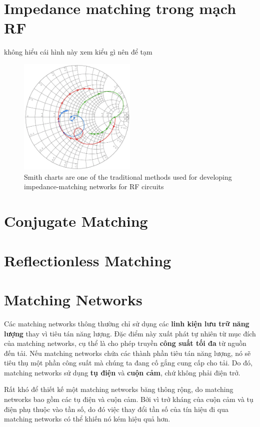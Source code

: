     \section{Impedance matching trong mạch RF}
        không hiểu cái hình này xem kiểu gì nên để tạm\cite{cadence_impedance}
        \begin{figure}[h]
            \centering
            \includegraphics[width=0.5\textwidth]{figures/smith_chart.png}
            \caption{Smith charts are one of the traditional methods used for developing impedance-matching networks for RF circuits}
            \label{fig:smith_chart}
        \end{figure}

    \section{Conjugate Matching}
    \section{Reflectionless Matching}
    \cite{cadence2021conjugatematching}
    
    \section{Matching Networks}
        Các matching networks thông thường chỉ sử dụng các \textbf{linh kiện lưu trữ năng lượng} 
        thay vì tiêu tán năng lượng. Đặc điểm này xuất phát tự nhiên từ mục đích 
        của matching networks, cụ thể là cho phép truyền \textbf{công suất tối đa} từ nguồn đến tải. 
        Nếu matching networks chứa các thành phần tiêu tán năng lượng, nó sẽ tiêu thụ một phần công suất 
        mà chúng ta đang cố gắng cung cấp cho tải. Do đó, matching networks sử dụng \textbf{tụ điện} 
        và \textbf{cuộn cảm}, chứ không phải điện trở.\par

        Rất khó để thiết kế một matching networks băng thông rộng, do matching networks bao gồm các tụ điện và cuộn cảm.
        Bởi vì trở kháng của cuộn cảm và tụ điện phụ thuộc vào tần số, do đó việc thay đổi tần số của tín hiệu đi qua matching networks 
        có thể khiến nó kém hiệu quả hơn.\cite{allaboutcircuits_matchingNetworks}\par